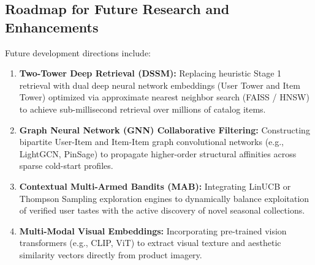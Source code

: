 \subsection{Roadmap for Future Research and Enhancements}
Future development directions include:
\begin{enumerate}
    \item \textbf{Two-Tower Deep Retrieval (DSSM):} Replacing heuristic Stage 1 retrieval with dual deep neural network embeddings (User Tower and Item Tower) optimized via approximate nearest neighbor search (FAISS / HNSW) to achieve sub-millisecond retrieval over millions of catalog items.
    \item \textbf{Graph Neural Network (GNN) Collaborative Filtering:} Constructing bipartite User-Item and Item-Item graph convolutional networks (e.g., LightGCN, PinSage) to propagate higher-order structural affinities across sparse cold-start profiles.
    \item \textbf{Contextual Multi-Armed Bandits (MAB):} Integrating LinUCB or Thompson Sampling exploration engines to dynamically balance exploitation of verified user tastes with the active discovery of novel seasonal collections.
    \item \textbf{Multi-Modal Visual Embeddings:} Incorporating pre-trained vision transformers (e.g., CLIP, ViT) to extract visual texture and aesthetic similarity vectors directly from product imagery.
\end{enumerate}
